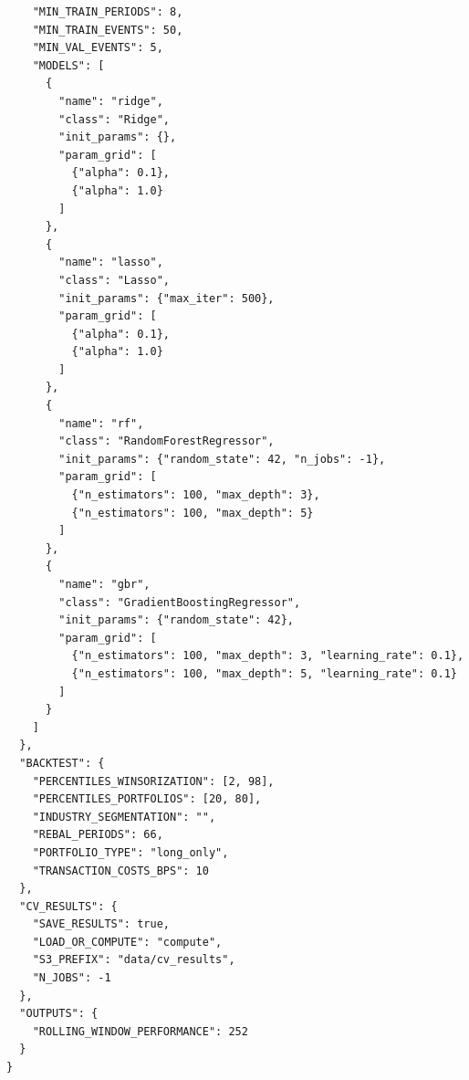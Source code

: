 \documentclass{article}
\begin{document}
\begin{lstlisting}
    "MIN_TRAIN_PERIODS": 8,
    "MIN_TRAIN_EVENTS": 50,
    "MIN_VAL_EVENTS": 5,
    "MODELS": [
      {
        "name": "ridge",
        "class": "Ridge",
        "init_params": {},
        "param_grid": [
          {"alpha": 0.1},
          {"alpha": 1.0}
        ]
      },
      {
        "name": "lasso",
        "class": "Lasso",
        "init_params": {"max_iter": 500},
        "param_grid": [
          {"alpha": 0.1},
          {"alpha": 1.0}
        ]
      },
      {
        "name": "rf",
        "class": "RandomForestRegressor",
        "init_params": {"random_state": 42, "n_jobs": -1},
        "param_grid": [
          {"n_estimators": 100, "max_depth": 3},
          {"n_estimators": 100, "max_depth": 5}
        ]
      },
      {
        "name": "gbr",
        "class": "GradientBoostingRegressor",
        "init_params": {"random_state": 42},
        "param_grid": [
          {"n_estimators": 100, "max_depth": 3, "learning_rate": 0.1},
          {"n_estimators": 100, "max_depth": 5, "learning_rate": 0.1}
        ]
      }
    ]
  },
  "BACKTEST": {
    "PERCENTILES_WINSORIZATION": [2, 98],
    "PERCENTILES_PORTFOLIOS": [20, 80],
    "INDUSTRY_SEGMENTATION": "",
    "REBAL_PERIODS": 66,
    "PORTFOLIO_TYPE": "long_only",
    "TRANSACTION_COSTS_BPS": 10
  },
  "CV_RESULTS": {
    "SAVE_RESULTS": true,
    "LOAD_OR_COMPUTE": "compute",
    "S3_PREFIX": "data/cv_results",
    "N_JOBS": -1
  },
  "OUTPUTS": {
    "ROLLING_WINDOW_PERFORMANCE": 252
  }
}
\end{lstlisting}
\end{document}

